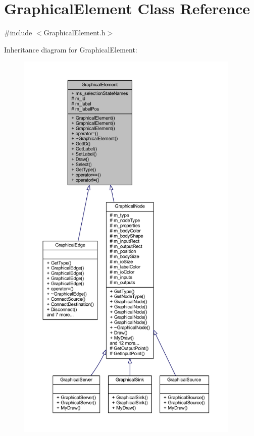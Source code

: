 \hypertarget{class_graphical_element}{}\section{Graphical\+Element Class Reference}
\label{class_graphical_element}


{\ttfamily \#include $<$Graphical\+Element.\+h$>$}



Inheritance diagram for Graphical\+Element\+:
\nopagebreak
\begin{figure}[H]
\begin{center}
\leavevmode
\includegraphics[height=550pt]{class_graphical_element__inherit__graph}
\end{center}
\end{figure}


